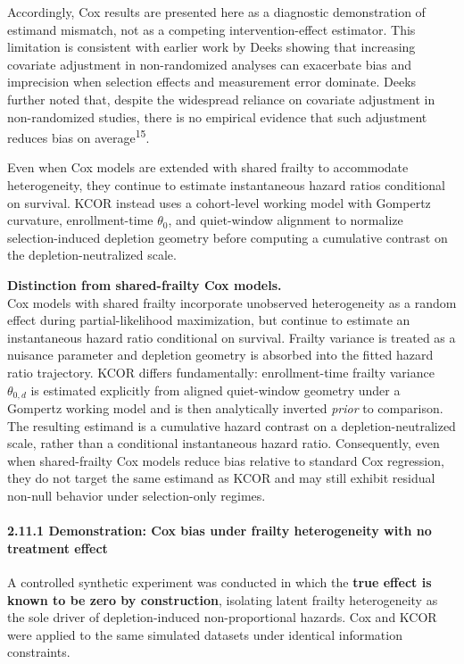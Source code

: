 \documentclass[
]{article}
\begin{document}
Accordingly, Cox results are presented here as a diagnostic
demonstration of estimand mismatch, not as a competing
intervention-effect estimator. This limitation is consistent with
earlier work by Deeks showing that increasing covariate adjustment in
non-randomized analyses can exacerbate bias and imprecision when
selection effects and measurement error dominate. Deeks further noted
that, despite the widespread reliance on covariate adjustment in
non-randomized studies, there is no empirical evidence that such
adjustment reduces bias on average\textsuperscript{15}.

Even when Cox models are extended with shared frailty to accommodate
heterogeneity, they continue to estimate instantaneous hazard ratios
conditional on survival. KCOR instead uses a cohort-level working model
with Gompertz curvature, enrollment-time \(\theta_0\), and quiet-window
alignment to normalize selection-induced depletion geometry before
computing a cumulative contrast on the depletion-neutralized scale.

\textbf{Distinction from shared-frailty Cox models.}\\
Cox models with shared frailty incorporate unobserved heterogeneity as a
random effect during partial-likelihood maximization, but continue to
estimate an instantaneous hazard ratio conditional on survival. Frailty
variance is treated as a nuisance parameter and depletion geometry is
absorbed into the fitted hazard ratio trajectory. KCOR differs
fundamentally: enrollment-time frailty variance \(\theta_{0,d}\) is
estimated explicitly from aligned quiet-window geometry under a Gompertz
working model and is then analytically inverted \emph{prior} to
comparison. The resulting estimand is a cumulative hazard contrast on a
depletion-neutralized scale, rather than a conditional instantaneous
hazard ratio. Consequently, even when shared-frailty Cox models reduce
bias relative to standard Cox regression, they do not target the same
estimand as KCOR and may still exhibit residual non-null behavior under
selection-only regimes.

\paragraph{2.11.1 Demonstration: Cox bias under frailty heterogeneity
with no treatment
effect}\label{demonstration-cox-bias-under-frailty-heterogeneity-with-no-treatment-effect}

A controlled synthetic experiment was conducted in which the
\textbf{true effect is known to be zero by construction}, isolating
latent frailty heterogeneity as the sole driver of depletion-induced
non-proportional hazards. Cox and KCOR were applied to the same
simulated datasets under identical information constraints.
\end{document}
